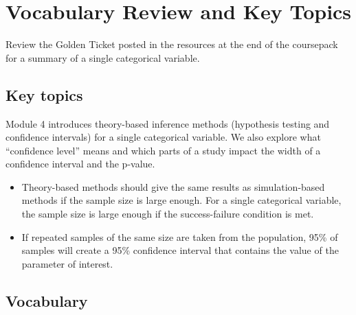\documentclass[
]{report}
\begin{document}
\section{Vocabulary Review and Key Topics}\label{vocabulary-review-and-key-topics-3}

Review the Golden Ticket posted in the resources at the end of the coursepack for a summary of a single categorical variable.

\subsection{Key topics}\label{key-topics-3}

Module 4 introduces theory-based inference methods (hypothesis testing and confidence intervals) for a single categorical variable. We also explore what ``confidence level'' means and which parts of a study impact the width of a confidence interval and the p-value.

\begin{itemize}
\item
  Theory-based methods should give the same results as simulation-based methods if the sample size is large enough. For a single categorical variable, the sample size is large enough if the success-failure condition is met.
\item
  If repeated samples of the same size are taken from the population, 95\% of samples will create a 95\% confidence interval that contains the value of the parameter of interest.
\end{itemize}

\subsection{Vocabulary}\label{vocabulary-3}
\end{document}
